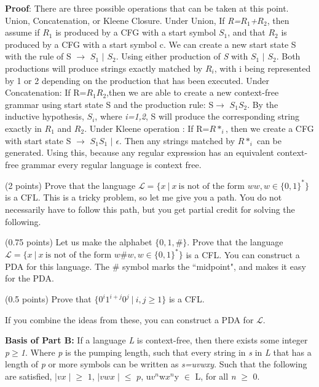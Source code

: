 \documentclass{article}
\newcommand{\cL}{\mathcal{L}}
\begin{document}
\begin{compactenum}
\textbf{Proof}: There are three possible operations that can be taken at this point. Union, Concatenation, or Kleene Closure. Under Union, If \emph{R=${R_1}$+${R_2}$}, then assume if ${ R_1}$ is produced by a CFG with a start symbol ${S_1}$, and that ${R_2}$  is produced by a CFG with a start symbol c. We can create a new start state S with the rule of S $\rightarrow$ ${S_1}$ $\mid$ ${S_2}$. Using either production of \emph {S} with ${S_1}$ $\mid$ ${S_2}$. Both productions will produce strings exactly matched by ${R_i}$, with i being represented by 1 or 2 depending on the production that has been executed.
Under Concatenation: If R=${R_1}$${R_2}$,then we are able to create a new context-free grammar using start state S and the production rule: S$\rightarrow$ ${S_1}$${S_2}$. By the inductive hypothesis, ${S_i}$, where \emph{i=1,2}, S will produce the corresponding string exactly in ${R_1}$ and ${R_2}$.
Under Kleene operation : If R=${R*_i}$, then we create a CFG with start state  S $\rightarrow$ ${S_1}$${S_1}$ $\mid$ $\epsilon$. Then any strings matched by ${R*_i}$ can be generated.
Using this, because any regular expression has an equivalent context-free grammar every regular language is context free. 
\medskip
\item (2 points) Prove that the language $\cL = \{x \ | \ x \ \textrm{is not of the form $ww, w \in \{0,1\}^*$} \}$
is a CFL. This is a tricky problem, so let me give you a path. You do not necessarily have
to follow this path, but you get partial credit for solving the following.
\begin{compactenum}
    \item (0.75 points) Let us make the alphabet $\{0,1,\#\}$. 
    Prove that the language $\cL = \{x \ | \ x \ \textrm{is not of the form $w\#w, w \in \{0,1\}^*$} \}$
    is a CFL. You can construct a PDA for this language. The $\#$ symbol marks the ``midpoint", and
    makes it easy for the PDA.
    \item (0.5 points) Prove that $\{0^i1^{i+j}0^j \ | \ i,j \geq 1\}$ is a CFL.
\end{compactenum}
If you combine the ideas from these, you can construct a PDA for $\cL$.

\textbf{Basis of Part B:} If a language \emph{L} is context-free, then there exists some integer \emph{p$\geq$1}. Where \emph {p} is the pumping length, such that every string in \emph{s} in \emph{L} that has a length of \emph{p} or more symbols can be written as \emph{s=uvwxy}. Such that the following are satisfied, $\mid vx \mid$$\geq$ $1$, $\mid vwx \mid$$\leq$ $p$, u$v^{n}$w$x^{n}$y $\in$ L, for all \emph{n} $\geq$ 0. 


\end{compactenum}
\end{document}

